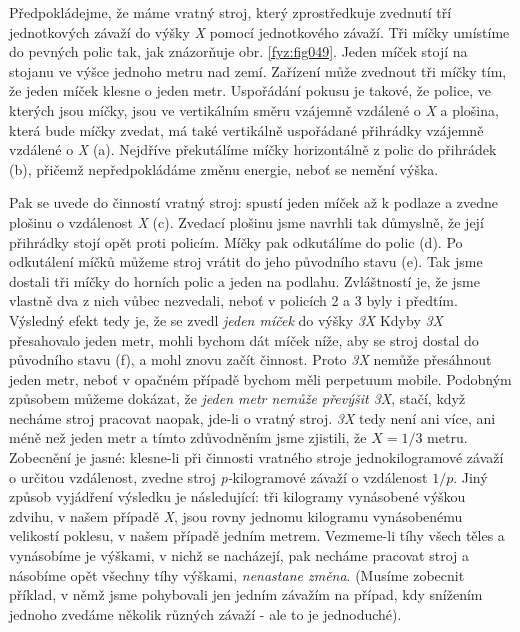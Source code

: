 {    Předpokládejme, že máme vratný stroj, který zprostředkuje zvednutí tří jednotkových závaží do 
    výšky \emph{X} pomocí jednotkového závaží. Tři míčky umístíme do pevných polic tak, jak 
    znázorňuje obr. \ref{fyz:fig049}. Jeden míček stojí na stojanu ve výšce jednoho metru nad zemí. 
    Zařízení může zvednout tři míčky tím, že jeden míček klesne o jeden metr. Uspořádání pokusu je 
    takové, že police, ve kterých jsou míčky, jsou ve vertikálním směru vzájemně vzdálené o 
    \emph{X} a plošina, která bude míčky zvedat, má také vertikálně uspořádané přihrádky vzájemně 
    vzdálené o \emph{X} (a). Nejdříve překutálíme míčky horizontálně z polic do přihrádek (b), 
    přičemž nepředpokládáme změnu energie, neboť se nemění výška.

    Pak se uvede do činností vratný stroj: spustí jeden míček až k podlaze a zvedne plošinu o 
    vzdálenost \emph{X} (c). Zvedací plošinu jsme navrhli tak důmyslně, že její přihrádky stojí 
    opět proti policím. Míčky pak odkutálíme do polic (d). Po odkutálení míčků můžeme stroj vrátit 
    do jeho původního stavu (e). Tak jsme dostali tři míčky do horních polic a jeden na podlahu. 
    Zvláštností je, že jsme vlastně dva z nich vůbec nezvedali, neboť v policích 2 a 3 byly i 
    předtím. Výsledný efekt tedy je, že se zvedl \emph{jeden míček} do výšky \emph{3X} Kdyby 
    \emph{3X} přesahovalo jeden metr, mohli bychom dát míček níže, aby se stroj dostal do původního 
    stavu (f), a mohl znovu začít činnost. Proto \emph{3X} nemůže přesáhnout jeden metr, neboť v 
    opačném případě bychom měli perpetuum mobile. Podobným způsobem můžeme dokázat, že \emph{jeden 
    metr nemůže převýšit 3X}, stačí, když necháme stroj pracovat naopak, jde-li o vratný stroj. 
    \emph{3X} tedy není ani více, ani méně než jeden metr a tímto zdůvodněním jsme zjistili, že 
    \(X= 1/3\) metru. Zobecnění je jasné: klesne-li při činnosti vratného stroje jednokilogramové 
    závaží o určitou vzdálenost, zvedne stroj \emph{p-}kilogramové závaží o vzdálenost \(1/p\). 
    Jiný způsob vyjádření výsledku je následující: tři kilogramy vynásobené výškou zdvihu, v našem 
    případě \emph{X}, jsou rovny jednomu kilogramu vynásobenému velikostí poklesu, v našem případě 
    jedním metrem. Vezmeme-li tíhy všech těles a vynásobíme je výškami, v nichž se nacházejí, pak 
    necháme pracovat stroj a násobíme opět všechny tíhy výškami, \emph{nenastane změna}. (Musíme 
    zobecnit příklad, v němž jsme pohybovali jen jedním závažím na případ, kdy snížením jednoho 
    zvedáme několik různých závaží - ale to je jednoduché).
    
}
